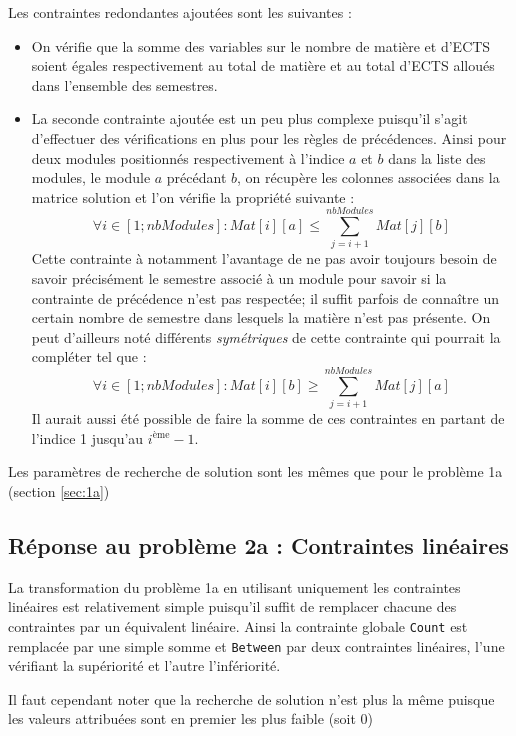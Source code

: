 \documentclass[a4paper, 11pt]{article}
\begin{document}
Les contraintes redondantes ajoutées sont les suivantes :
\begin{itemize}
 \item On vérifie que la somme des variables sur le nombre de matière et d'ECTS soient égales respectivement au total de matière et au total d'ECTS alloués dans l'ensemble des semestres.
\item La seconde contrainte ajoutée est un peu plus complexe puisqu'il s'agit d'effectuer des vérifications en plus pour les règles de précédences. Ainsi pour deux modules positionnés respectivement à l'indice $a$ et $b$ dans la liste des modules, le module $a$ précédant $b$, on récupère les colonnes associées dans la matrice solution et l'on vérifie la propriété suivante :
\begin{equation} 
 \forall i  \in {[1; nbModules]} : Mat[i][a] \leq \sum_{j=i+1}^{nbModules} Mat[j][b]
\end{equation}
Cette contrainte à notamment l'avantage de ne pas avoir toujours besoin de savoir précisément le semestre associé à un module pour savoir si la contrainte de précédence n'est pas respectée; il suffit parfois de connaître un certain nombre de semestre dans lesquels la matière n'est pas présente. On peut d'ailleurs noté différents \emph{symétriques} de cette contrainte qui pourrait la compléter tel que :
\begin{equation*} 
 \forall i  \in {[1; nbModules]} : Mat[i][b] \geq \sum_{j=i+1}^{nbModules} Mat[j][a]
\end{equation*}
Il aurait aussi été possible de faire la somme de ces contraintes en partant de l'indice 1 jusqu'au $i^{\text{ème}} -1$.
\end{itemize}


Les paramètres de recherche de solution sont les mêmes que pour le problème 1a (section \ref{sec:1a})


\subsection{Réponse au problème 2a : Contraintes linéaires}\label{sec:2a}
La transformation du problème 1a en utilisant uniquement les contraintes linéaires est relativement simple puisqu'il suffit de remplacer chacune des contraintes par un équivalent linéaire.
Ainsi la contrainte globale \verb+Count+ est remplacée par une simple somme et \verb+Between+ par deux contraintes linéaires, l'une vérifiant la supériorité et l'autre l'infériorité.

Il faut cependant noter que la recherche de solution n'est plus la même puisque les valeurs attribuées sont en premier les plus faible (soit 0)
\end{document}

